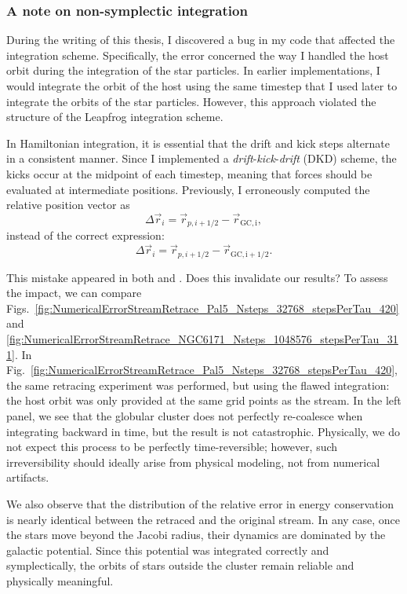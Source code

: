         \subsubsection{A note on non-symplectic integration}

        During the writing of this thesis, I discovered a bug in my code that affected the integration scheme. Specifically, the error concerned the way I handled the host orbit during the integration of the star particles. In earlier implementations, I would integrate the orbit of the host using the same timestep that I used later to integrate the orbits of the star particles. However, this approach violated the structure of the Leapfrog integration scheme.

        In Hamiltonian integration, it is essential that the drift and kick steps alternate in a consistent manner. Since I implemented a \textit{drift}-\textit{kick}-\textit{drift} (DKD) scheme, the kicks occur at the midpoint of each timestep, meaning that forces should be evaluated at intermediate positions. Previously, I erroneously computed the relative position vector as
        \[
        \Delta \vec{r}_i = \vec{r}_{p,i+1/2} - \vec{r}_\mathrm{GC,i},
        \]
        instead of the correct expression:
        \[
        \Delta \vec{r}_i = \vec{r}_{p,i+1/2} - \vec{r}_\mathrm{GC,i+1/2}.
        \]

        This mistake appeared in both \citet{2023A&A...673A..44F} and \citet{2025A&A...699A.289F}. Does this invalidate our results? To assess the impact, we can compare Figs.~\ref{fig:NumericalErrorStreamRetrace_Pal5_Nsteps_32768_stepsPerTau_420} and \ref{fig:NumericalErrorStreamRetrace_NGC6171_Nsteps_1048576_stepsPerTau_311}. In Fig.~\ref{fig:NumericalErrorStreamRetrace_Pal5_Nsteps_32768_stepsPerTau_420}, the same retracing experiment was performed, but using the flawed integration: the host orbit was only provided at the same grid points as the stream. In the left panel, we see that the globular cluster does not perfectly re-coalesce when integrating backward in time, but the result is not catastrophic. Physically, we do not expect this process to be perfectly time-reversible; however, such irreversibility should ideally arise from physical modeling, not from numerical artifacts.

        We also observe that the distribution of the relative error in energy conservation is nearly identical between the retraced and the original stream. In any case, once the stars move beyond the Jacobi radius, their dynamics are dominated by the galactic potential. Since this potential was integrated correctly and symplectically, the orbits of stars outside the cluster remain reliable and physically meaningful.


